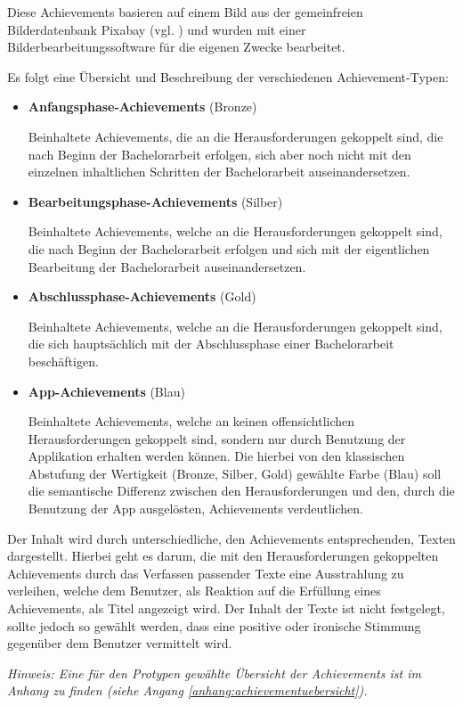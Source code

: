 \documentclass[bibliography=totoc,listof=totoc,BCOR=5mm,DIV=12,oneside]{scrbook}
\begin{document}
\par \bigskip Diese Achievements basieren auf einem Bild aus der gemeinfreien Bilderdatenbank Pixabay (vgl. \citep{PixabayAchievement}) und wurden mit einer Bilderbearbeitungssoftware für die eigenen Zwecke bearbeitet.

\par \bigskip Es folgt eine Übersicht und Beschreibung der verschiedenen Achievement-Typen:
\begin{itemize}
\item \textbf{Anfangsphase-Achievements} (Bronze)
\par Beinhaltete Achievements, die an die Herausforderungen gekoppelt sind, die nach Beginn der Bachelorarbeit erfolgen, sich aber noch nicht mit den einzelnen inhaltlichen Schritten der Bachelorarbeit auseinandersetzen.
\item \textbf{Bearbeitungsphase-Achievements} (Silber)
\par Beinhaltete Achievements, welche an die Herausforderungen gekoppelt sind, die nach Beginn der Bachelorarbeit erfolgen und sich mit der eigentlichen Bearbeitung der Bachelorarbeit auseinandersetzen.
\item \textbf{Abschlussphase-Achievements} (Gold)
\par Beinhaltete Achievements, welche an die Herausforderungen gekoppelt sind, die sich hauptsächlich mit der Abschlussphase einer Bachelorarbeit beschäftigen.
\item \textbf{App-Achievements} (Blau)
\par Beinhaltete Achievements, welche an keinen offensichtlichen Herausforderungen gekoppelt sind, sondern nur durch Benutzung der Applikation erhalten werden können. Die hierbei von den klassischen Abstufung der Wertigkeit (Bronze, Silber, Gold) gewählte Farbe (Blau) soll die semantische Differenz zwischen den Herausforderungen und den, durch die Benutzung der App ausgelösten, Achievements verdeutlichen. 
\end{itemize} 

\par \bigskip Der Inhalt wird durch unterschiedliche, den Achievements entsprechenden, Texten dargestellt. Hierbei geht es darum, die mit den Herausforderungen gekoppelten Achievements durch das Verfassen passender Texte eine Ausstrahlung zu verleihen, welche dem Benutzer, als Reaktion auf die Erfüllung eines Achievements, als Titel angezeigt wird. Der Inhalt der Texte ist nicht festgelegt, sollte jedoch so gewählt werden, dass eine positive oder ironische Stimmung gegenüber dem Benutzer vermittelt wird.
\par \bigskip \textit{Hinweis: Eine für den Protypen gewählte Übersicht der Achievements ist im Anhang zu finden (siehe Angang \ref{anhang:achievementuebersicht}).}
\end{document}
